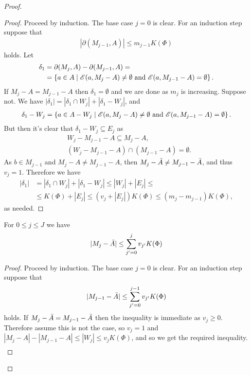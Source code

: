 \begin{proof}
  \begin{proof} %
    Proceed by induction. The base case $j = 0$ is clear.
    For an induction step suppose that
    \begin{align*}
      |\partial(M_{j-1}, A)| \leq m_{j-1}  K(\Phi)
    \end{align*}
    holds.
    Let
    \begin{align*}
      \delta_1 &= \partial(M_j, A) - \partial(M_{j-1}, A) = \\
               &=\left\{a \in A \mid  \mathscr E(a, M_j - A) \neq \emptyset \text{ and } \mathscr E(a, M_{j-1} - A) = \emptyset\right\}.
    \end{align*}
    If $M_j - A = M_{j-1} - A$ then $\delta_1 = \emptyset$ and we are done as $m_j$ is increasing.
    Suppose not.
    We have $|\delta_1| = |\delta_1 \cap W_j| + |\delta_1 - W_j|$, and
    \begin{align*}
      \delta_1 - W_j = \left\{a \in A - W_j \mid \mathscr E(a, M_j - A) \neq \emptyset \text{ and } \mathscr E(a, M_{j-1} - A) = \emptyset\right\}.
    \end{align*}
    But then it's clear that $\delta_1 - W_j \subseteq E_j$ as
    \begin{align*}
      &W_j - M_{j-1} - A \subseteq M_j - A, \\
      &(W_j - M_{j-1} - A) \cap (M_{j-1} - A) = \emptyset.
    \end{align*}
    As $b \in M_{j-1}$ and $M_j - A \neq M_{j-1} - A$, then $M_j - \bar A \neq M_{j-1} - \bar A$, and thus $v_j = 1$. 
    Therefore we have
    \begin{align*}
      |\delta_1| &= |\delta_1 \cap W_j| + |\delta_1 - W_j| \leq |W_j| + |E_j| \leq \\
      &\leq K(\Phi) + |E_j|
      \leq (v_j + |E_j|) K(\Phi)  \leq (m_j - m_{j-1}) K(\Phi),
    \end{align*}
    as needed.
  \end{proof}

  \begin{Lemma} \label{ub_lemma}
    For $0 \leq j \leq J$ we have
    \begin{align*}
      |M_j - \bar A| \leq \sum_{j'=0}^j v_{j'} K(\Phi)
    \end{align*}
  \end{Lemma}

  \begin{proof} %
    Proceed by induction. The base case $j = 0$ is clear.
    For an induction step suppose that
    \begin{align*}
      |M_{j-1} - \bar A| \leq \sum_{j'=0}^{j-1} v_{j'} K(\Phi)
    \end{align*}
    holds.
    If $M_j - \bar A = M_{j-1} - \bar A$ then the inequality is immediate as $v_j \geq 0$.
    Therefore assume this is not the case, so $v_j = 1$ and $|M_j - A| - |M_{j-1} - A| \leq |W_j| \leq v_j K(\Phi)$, and so we get the required inequality.
    \begin{align*}
    \end{align*}
  \end{proof}
  

\end{proof}
